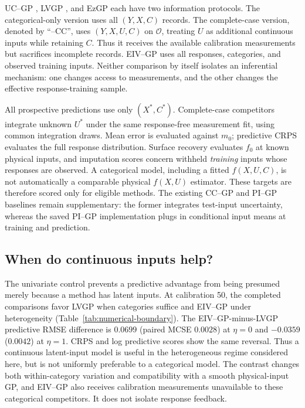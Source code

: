 UC--GP \citep{qian2008gaussian,zhou2011simple}, LVGP \citep{zhang2020latent}, and EzGP \citep{xiao2021ezgp} each have two information protocols. The categorical-only version uses all $(Y,X,C)$ records. The complete-case version, denoted by ``--CC'', uses $(Y,X,U,C)$ on $\mathcal O$, treating $U$ as additional continuous inputs while retaining $C$. Thus it receives the available calibration measurements but sacrifices incomplete records. EIV--GP uses all responses, categories, and observed training inputs. Neither comparison by itself isolates an inferential mechanism: one changes access to measurements, and the other changes the effective response-training sample.

All prospective predictions use only $(X^*,C^*)$. Complete-case competitors integrate unknown $U^*$ under the same response-free measurement fit, using common integration draws. Mean error is evaluated against $m_0$; predictive CRPS evaluates the full response distribution. Surface recovery evaluates $f_0$ at known physical inputs, and imputation scores concern withheld \emph{training} inputs whose responses are observed. A categorical model, including a fitted $f(X,U,C)$, is not automatically a comparable physical $f(X,U)$ estimator. These targets are therefore scored only for eligible methods. The existing CC--GP and PI--GP baselines remain supplementary: the former integrates test-input uncertainty, whereas the saved PI--GP implementation plugs in conditional input means at training and prediction.

\subsection{When do continuous inputs help?}
The univariate control prevents a predictive advantage from being presumed merely because a method has latent inputs. At calibration 50, the completed comparisons favor LVGP when categories suffice and EIV--GP under heterogeneity (Table~\ref{tab:numerical-boundary}). The EIV--GP-minus-LVGP predictive RMSE difference is $0.0699$ (paired MCSE $0.0028$) at $\eta=0$ and $-0.0359$ ($0.0042$) at $\eta=1$. CRPS and log predictive scores show the same reversal. Thus a continuous latent-input model is useful in the heterogeneous regime considered here, but is not uniformly preferable to a categorical model. The contrast changes both within-category variation and compatibility with a smooth physical-input GP, and EIV--GP also receives calibration measurements unavailable to these categorical competitors. It does not isolate response feedback.

